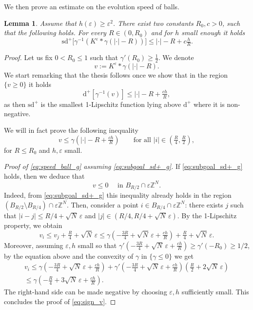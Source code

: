 \documentclass[10pt]{amsart}
\theoremstyle{plain}
\newtheorem{lemma}[theorem]{Lemma}
\theoremstyle{definition}
\newcommand{\Z}{\mathbb{Z}}
\newcommand{\g}{\gamma}
\newcommand{\e}{\varepsilon}
\newcommand{\sd}{\,\mathrm{sd}}
\newcommand{\ez}{\e\Z^N}
\numberwithin{equation}{section}
\begin{document}
We then prove an estimate on the evolution speed of balls. 
 
\begin{lemma}\label{lem:evol_balls_g}
    Assume that $h(\e)\ge \e^2$.  There exist two constants $R_0,c>0$, such that the following holds. For every $R\in (0,R_0)$ and  for $h$ small enough  it holds
\begin{equation}\label{eq:speed_ball_g}
\sd^+\Big[\gamma^{-1}(K^\e\ast \gamma(|\cdot|-R))\Big]\le |\cdot|-R + c\tfrac hR.
\end{equation}
\end{lemma}

\begin{proof}
Let us fix $0<R_0\le 1$ such that $\g'(R_0)\ge \frac12$. We denote 
\[
v:=K^\e\ast \g(|\cdot|-R).
\]
We start remarking that  the thesis 
follows once we show that in the region $\{ v\ge 0\}$ it holds 
\begin{equation}\label{eq:goal_sd+_g}
    \text{d}^+[\g^{-1}( v)]\le |\cdot|-R+\tfrac{ch}R,
\end{equation}
as then $\text{sd}^+$ is the smallest 1-Lipschitz function lying above $\text{d}^+$ where it is non-negative. 



We will in fact prove the following inequality
\begin{equation}\label{eq:subgoal_sd+_g}
    v\le \g(|\cdot|-R+\tfrac{ch}R)  \qquad \text{for all } |i|\in (\tfrac R4, \tfrac R2 ),
\end{equation}
for $R\le R_0$ and $h,\e$ small. 


 
\noindent\textit{Proof of \eqref{eq:speed_ball_g} assuming \eqref{eq:subgoal_sd+_g}.}
If \eqref{eq:subgoal_sd+_g} holds, then we deduce that  
\begin{equation}\label{eq:sign_v}
    v\le 0\quad  \text{ in } B_{R/2}\cap \ez.
\end{equation}
Indeed, from \eqref{eq:subgoal_sd+_g} this inequality already holds in the region $(B_{R/2}\setminus B_{R/4})\cap \ez$. Then, consider a point $i \in B_{R/4} \cap \ez$: there exists $j$ such that $|i - j| \le R/4 + \sqrt{N}\, \e$ and $  |j| \in (R/4,R/4 + \sqrt{N}\, \e)$. By the 1-Lipschitz property, we obtain
\[
v_i \le v_j + \tfrac{R}{4} + \sqrt{N}\, \e \le \g\left(-\tfrac{3R}{4} + \sqrt{N}\, \e + \tfrac{ch}{R}\right) + \tfrac{R}{4} + \sqrt{N}\, \e.
\]
Moreover, assuming $\e,h$  small so that $\g'(-\tfrac{3R}{4} + \sqrt{N}\, \e + \tfrac{ch}{R}) \ge \g'(-R_0) \ge 1/2$, by the equation above and the  convexity of $\g$ in $\{\g \le 0\}$ we get 
\[
\begin{split}
v_i \le \g\left(-\tfrac{3R}{4} + \sqrt{N}\, \e + \tfrac{ch}{R}\right) + \g'\left(-\tfrac{3R}{4} + \sqrt{N}\, \e + \tfrac{ch}{R}\right)\left(\tfrac{R}{2} + 2\sqrt{N}\, \e\right)\\
\le \g\left(-\tfrac{R}{4} + 3\sqrt{N}\, \e + \tfrac{ch}{R}\right).
\end{split}
\]
The right-hand side can be made negative by choosing $\e, h$ sufficiently small. This concludes the proof of \eqref{eq:sign_v}.


\end{proof}
\end{document}
